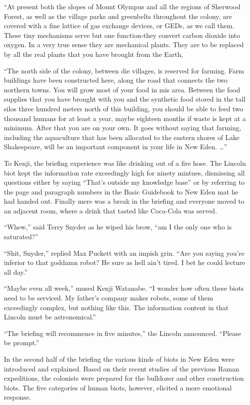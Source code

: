 \documentclass[]{article}
\begin{document}
{“At present both the slopes of Mount Olympus and all the regions of Sherwood Forest, as well as the village parks and greenbelts throughout the colony, are covered with a fine lattice of gas exchange devices, or GEDs, as we call them.  These tiny mechanisms serve but one function-they convert carbon dioxide into oxygen.  In a very true sense they are mechanical plants.  They are to be replaced by all the real plants that you have brought from the Earth,

“The north side of the colony, between die villages, is reserved for farming.  Farm buildings have been constructed here, along the road that connects the two northern towns.  You will grow most of your food in mis area.  Between the food supplies that you have brought with you and the synthetic food stored in the tall silos three hundred meters north of this building, you should be able to feed two thousand humans for at least a year, maybe eighteen months if waste is kept at a minimum.  After that you are on your own.  It goes without saying that farming, including the aquaculture that has been allocated to the eastern shores of Lake Shakespeare, will be an important component in your life in New Eden.  …”

To Kenji, the briefing experience was like drinking out of a fire hose.  The Lincoln biot kept the information rate exceedingly high for ninety mintues, dismissing all questions either by saying “That’s outside my knowledge base” or by referring to the page and paragraph numbers in the Basic Guidebook to New Eden mat he had handed out.  Finally mere was a break in the briefing and everyone moved to an adjacent room, where a drink that tasted like Coca-Cola was served.

“Whew,” said Terry Snyder as he wiped his brow, “am I the only one who is saturated?”

“Shit, Snyder,” replied Max Puckett with an impish grin.  “Are you saying you’re inferior to that goddamn robot? He sure as hell ain’t tired.  I bet he could lecture all day.”

“Maybe even all week,” mused Kenji Watanabe.  “I wonder how often these biots need to be serviced.  My father’s company makes robots, some of them exceedingly complex, but nothing like this.  The information content in that Lincoln must be astronomical.”

“The briefing will recommence in five minutes,” the Lincoln announced.  “Please be prompt.”

In the second half of the briefing the various kinds of biots in New Eden were introduced and explained.  Based on their recent studies of the previous Raman expeditions, the colonists were prepared for the bulldozer and other construction biots.  The five categories of human biots, however, elicited a more emotional response.

}
\end{document}
